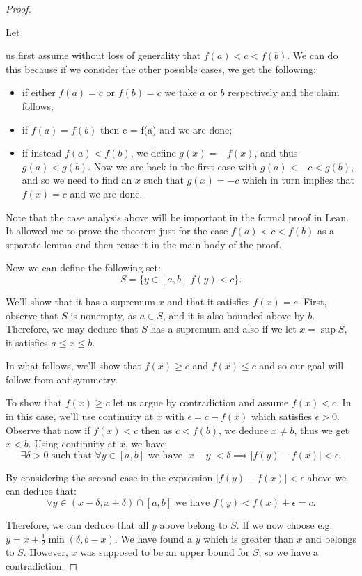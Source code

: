 \documentclass[11pt]{article}
\newcommand\sucht{\text{ such that }}
\newcommand\weh{\text{ we have }}
\begin{document}
\begin{proof}
  \hypertarget{general_cases}{Let} us first assume without loss of generality that $f(a) < c < f(b)$. We can
  do this because if we consider the other possible cases, we get the following:
  \begin{itemize}
    \item if either $f(a) = c$ or $f(b) = c$ we take $a$ or $b$ respectively
      and the claim follows;
    \item if $f(a) = f(b)$ then c = f(a) and we are done;
    \item if instead $f(a) < f(b)$, we define $g(x) = -f(x)$, and thus
      $g(a) < g(b)$. Now we are back in the first case with $g(a) < -c < g(b)$,
      and so we need to find an $x$ such that $g(x) = - c$ which in turn implies
      that $f(x) = c$ and we are done.
  \end{itemize}

Note that the case analysis above will be important in the formal proof in
Lean. It allowed me to prove the theorem just for the case $f(a) < c < f(b)$ as
a separate lemma and then reuse it in the main body of the proof.

Now we can define the following set:
\[
  S = \lbrace y \in [a, b] | f(y) < c\rbrace
.\]

We'll show that it has a supremum $x$ and that it satisfies $f(x) = c$. First,
observe that $S$ is nonempty, as $ a \in S $, and it is also bounded above by
$b$. Therefore, we may deduce that $S$ has a supremum and also if we let
$x = \sup S$, it satisfies $a \le x \le b$.

In what follows, we'll show that $f(x) \ge c$ and  $f(x) \le c$ and so our goal
will follow from antisymmetry.

To show that $f(x) \ge c$ let us argue by contradiction and assume $f(x) < c$.
In in this case, we'll use continuity at  $x$ with  $\epsilon = c - f(x) $
which satisfies  $\epsilon > 0$. Observe that now if $f(x) < c$ then as $c <
f(b)$, we deduce  $x \ne b$, thus we get  $x < b$. Using continuity at $x$, we have:
\[
\exists \delta > 0 \sucht \forall y \in [a, b] \weh | x - y | < \delta \implies |f(y) - f(x)| < \epsilon .\]

By considering the second case in the expression $|f(y) - f(x)| < \epsilon $ above
we can deduce that:
\[
  \forall y \in (x - \delta, x + \delta) \cap [a, b] \weh f(y) < f(x) + \epsilon = c
.\]

Therefore, we can deduce that  all $y$ above belong to $S$.
If we now choose e.g. $y = x + \frac{1}{2} \min(\delta, b - x)$. We have found
a $y$ which is greater than $x$ and belongs to $S$. However,  $x$ was supposed
to be an upper bound for  $S$, so we have a contradiction.


\end{proof}
\end{document}

